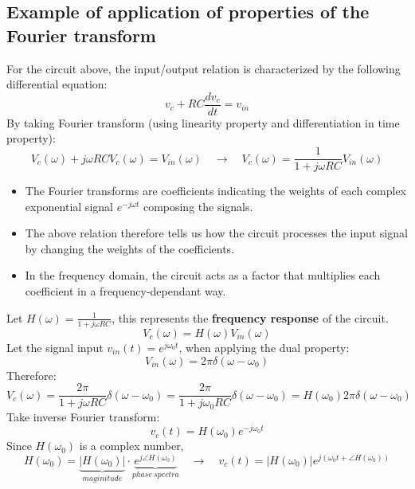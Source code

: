 \documentclass[12pt,a4paper]{article}
\begin{document}
\subsection{Example of application of properties of the Fourier transform}
\begin{tcolorbox}[breakable]
\begin{figure}[H] \begin{center}
\end{center} \end{figure}
For the circuit above, the input/output relation is characterized by the following differential equation:
\[ v_{c}+RC \frac{d v_{c}}{dt} = v_{in} \]
By taking Fourier transform (using linearity property and differentiation in time property):
\[ V_{c}(\omega) + j\omega RC V_{c}(\omega) = V_{in}(\omega) \quad \to \quad V_{c}(\omega) = \frac{1}{1+j\omega RC}V_{in}(\omega) \]
\begin{itemize}
\item The Fourier transforms are coefficients indicating the weights of each complex exponential signal $e^{-j \omega t}$ composing the signals. 
\item The above relation therefore tells us how the circuit processes the input signal by changing the weights of the coefficients. 
\item In the frequency domain, the circuit acts as a factor that multiplies each coefficient in a frequency-dependant way.
\end{itemize}
Let $H(\omega) = \frac{1}{1+j\omega RC}$, this represents the \textbf{frequency response} of the circuit.
\[ V_{c}(\omega) =H(\omega) V_{in}(\omega) \]
Let the signal input $v_{in}(t)=e^{j\omega_{0}t}$, when applying the dual property:
\[ V_{in}(\omega) = 2\pi \delta(\omega-\omega_{0}) \]
Therefore:
\[ V_{c}(\omega) = \frac{2 \pi}{1+j\omega RC}\delta(\omega-\omega_{0}) = \frac{2 \pi}{1+j\omega_{0} RC}\delta(\omega-\omega_{0}) = H(\omega_{0}) 2\pi\delta(\omega-\omega_{0}) \]
Take inverse Fourier transform:
\[ v_{c}(t) = H(\omega_{0})e^{-j\omega_{0} t} \]
Since $H(\omega_{0})$ is a complex number, 
\[ H(\omega_{0}) =\underbrace{\lvert H(\omega_{0}) \rvert}_{maginitude}\cdot \underbrace{e^{j \angle H(\omega_{0})}}_{phase \ spectra} \quad \to \quad  \boxed{v_{c}(t) = \lvert H(\omega_{0}) \rvert  e^{j(\omega_{0} t+ \angle H(\omega_{0}))}}\]

\end{tcolorbox}
\end{document}
